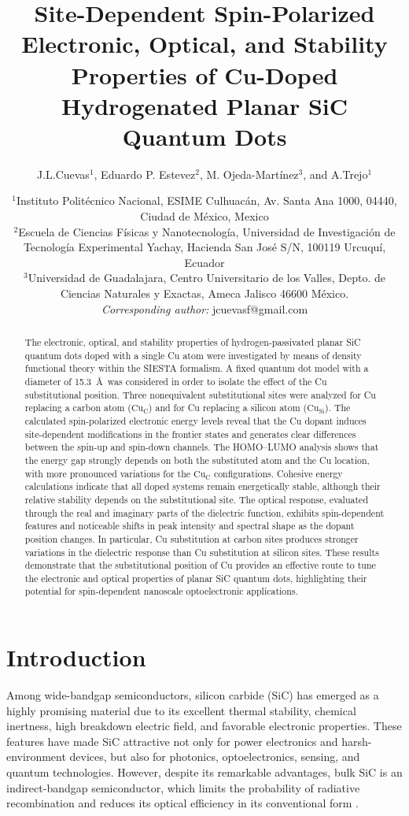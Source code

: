 \documentclass[11pt]{article} %
\title{Site-Dependent Spin-Polarized Electronic, Optical, and Stability Properties of Cu-Doped Hydrogenated Planar SiC Quantum Dots}
\author{J.L.Cuevas$^{1}$, Eduardo P. Estevez$^{2}$, M. Ojeda-Martínez$^{3}$, and A.Trejo$^{1}$}
\date{
	\small
	$^{1}$Instituto Politécnico Nacional, ESIME Culhuacán, Av. Santa Ana 1000, 04440, Ciudad de México, Mexico\\
	$^{2}$Escuela de Ciencias Físicas y Nanotecnología, Universidad de Investigación de Tecnología Experimental Yachay, Hacienda San José S/N, 100119 Urcuquí, Ecuador\\
	$^{3}$Universidad de Guadalajara, Centro Universitario de los Valles, Depto. de Ciencias Naturales y Exactas, Ameca Jalisco 46600 M\'exico.\\
	\textit{Corresponding author:} jcuevasf@gmail.com
}
\begin{document}
\maketitle
\begin{abstract}
		
	The electronic, optical, and stability properties of hydrogen-passivated planar SiC quantum dots doped with a single Cu atom were investigated by means of density functional theory within the SIESTA formalism. A fixed quantum dot model with a diameter of 15.3~\AA\ was considered in order to isolate the effect of the Cu substitutional position. Three nonequivalent substitutional sites were analyzed for Cu replacing a carbon atom ($\mathrm{Cu_C}$) and for Cu replacing a silicon atom ($\mathrm{Cu_{Si}}$). The calculated spin-polarized electronic energy levels reveal that the Cu dopant induces site-dependent modifications in the frontier states and generates clear differences between the spin-up and spin-down channels. The HOMO--LUMO analysis shows that the energy gap strongly depends on both the substituted atom and the Cu location, with more pronounced variations for the $\mathrm{Cu_C}$ configurations. Cohesive energy calculations indicate that all doped systems remain energetically stable, although their relative stability depends on the substitutional site. The optical response, evaluated through the real and imaginary parts of the dielectric function, exhibits spin-dependent features and noticeable shifts in peak intensity and spectral shape as the dopant position changes. In particular, Cu substitution at carbon sites produces stronger variations in the dielectric response than Cu substitution at silicon sites. These results demonstrate that the substitutional position of Cu provides an effective route to tune the electronic and optical properties of planar SiC quantum dots, highlighting their potential for spin-dependent nanoscale optoelectronic applications.
\end{abstract}

\section{Introduction}

Among wide-bandgap semiconductors, silicon carbide (SiC) has emerged as a highly promising material due to its excellent thermal stability, chemical inertness, high breakdown electric field, and favorable electronic properties. These features have made SiC attractive not only for power electronics and harsh-environment devices, but also for photonics, optoelectronics, sensing, and quantum technologies. However, despite its remarkable advantages, bulk SiC is an indirect-bandgap semiconductor, which limits the probability of radiative recombination and reduces its optical efficiency in its conventional form \cite{Ivanov1992,Yuanyuan_Li_2021,Fraga2025,Castelletto2020}.
\end{document}
